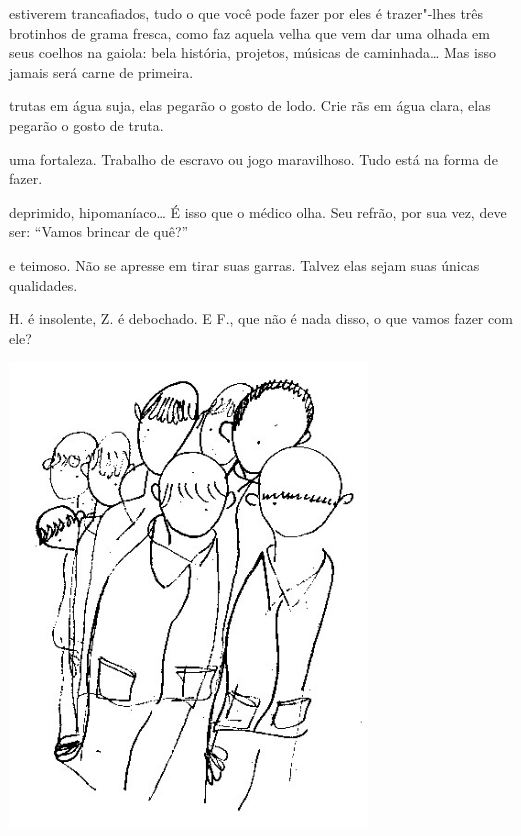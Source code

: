 \pagebreak

 estiverem trancafiados, tudo o que você pode fazer por eles é
trazer"-lhes três brotinhos de grama fresca, como faz aquela velha que
vem dar uma olhada em seus coelhos na gaiola: bela história, projetos,
músicas de caminhada\ldots{} Mas isso jamais será carne de primeira.


 trutas em água suja, elas pegarão o gosto de lodo. Crie rãs em água
clara, elas pegarão o gosto de truta.



 uma fortaleza. Trabalho de escravo ou jogo maravilhoso. Tudo
está na forma de fazer.



 deprimido, hipomaníaco\ldots{} É isso que o médico olha. Seu
refrão, por sua vez, deve ser: ``Vamos brincar de quê?''



 e teimoso. Não se apresse em tirar suas garras. Talvez elas
sejam suas únicas qualidades.



 H. é insolente, Z. é debochado. E F., que não é nada
disso, o que vamos fazer com ele?

\pagebreak


\pagebreak
\thispagestyle{empty}

\begin{vplace}[.50]
\begin{center}
\includegraphics[width=95mm]{./imgs/Image_10.jpg}
\end{center}
\end{vplace}


